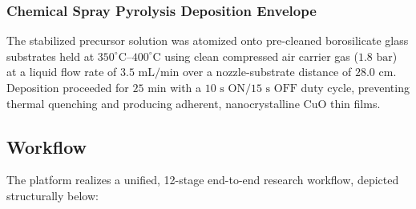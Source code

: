 \documentclass[12pt,a4paper,oneside]{report}
\begin{document}
{{{\subsubsection{Chemical Spray Pyrolysis Deposition Envelope}
The stabilized precursor solution was atomized onto pre-cleaned borosilicate glass substrates held at $350^\circ\text{C}\text{--}400^\circ\text{C}$ using clean compressed air carrier gas ($1.8\text{ bar}$) at a liquid flow rate of $3.5\text{ mL/min}$ over a nozzle-substrate distance of $28.0\text{ cm}$. Deposition proceeded for $25\text{ min}$ with a $10\text{ s ON} / 15\text{ s OFF}$ duty cycle, preventing thermal quenching and producing adherent, nanocrystalline $\text{CuO}$ thin films.

\subsection{Workflow}

The platform realizes a unified, 12-stage end-to-end research workflow, depicted structurally below:

}}}
\end{document}
